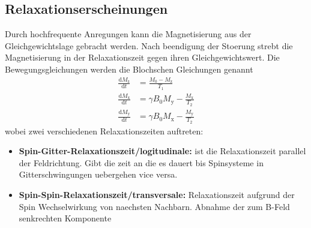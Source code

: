 \subsection{Relaxationserscheinungen}%
\label{sub:relaxationserscheinungen}
Durch hochfrequente Anregungen kann die Magnetisierung aus der
Gleichgewichtslage gebracht werden.
Nach beendigung der Stoerung strebt die Magnetisierung in der Relaxationszeit
gegen ihren Gleichgewichtswert. 
Die Bewegungsgleichungen werden die Blochschen Gleichungen genannt
\begin{align}
		\frac{\text{d} M_\text{z}}{\text{d} t} &= \frac{M_0 - M_\text{z}}{T_1} \\
		\frac{\text{d} M_\text{x}}{\text{d} t} &= \gamma B_0 M_\text{y} -
		\frac{M_\text{x}}{T_2} \\               
		\frac{\text{d} M_\text{y}}{\text{d} t} &= \gamma B_0 M_\text{x} - \frac{M_\text{y}}{T_2} 
\end{align}
wobei zwei verschiedenen Relaxationszeiten auftreten:
\begin{itemize}
		\item \textbf{Spin-Gitter-Relaxationszeit/logitudinale:}
				ist die Relaxationszeit parallel der Feldrichtung. Gibt die zeit
				an die es dauert bis Spinsysteme in Gitterschwingungen
				uebergehen vice versa. 
		\item \textbf{Spin-Spin-Relaxationszeit/transversale:} Relaxationszeit
				aufgrund der Spin Wechselwirkung von naechsten Nachbarn. Abnahme
				der zum B-Feld senkrechten Komponente
\end{itemize}

